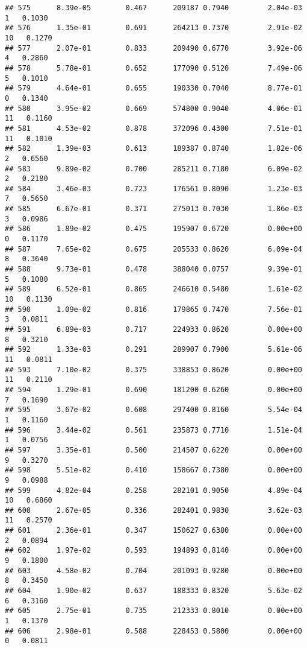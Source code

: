 \documentclass[
]{article}
\begin{document}
\begin{verbatim}
## 575      8.39e-05        0.467      209187 0.7940         2.04e-03   1   0.1030
## 576      1.35e-01        0.691      264213 0.7370         2.91e-02  10   0.1270
## 577      2.07e-01        0.833      209490 0.6770         3.92e-06   4   0.2860
## 578      5.78e-01        0.652      177090 0.5120         7.49e-06   5   0.1010
## 579      4.64e-01        0.655      190330 0.7040         8.77e-01   0   0.1340
## 580      3.95e-02        0.669      574800 0.9040         4.06e-01  11   0.1160
## 581      4.53e-02        0.878      372096 0.4300         7.51e-01  11   0.1010
## 582      1.39e-03        0.613      189387 0.8740         1.82e-06   2   0.6560
## 583      9.89e-02        0.700      285211 0.7180         6.09e-02   2   0.2180
## 584      3.46e-03        0.723      176561 0.8090         1.23e-03   7   0.5650
## 585      6.67e-01        0.371      275013 0.7030         1.86e-03   3   0.0986
## 586      1.89e-02        0.475      195907 0.6720         0.00e+00   0   0.1170
## 587      7.65e-02        0.675      205533 0.8620         6.09e-04   8   0.3640
## 588      9.73e-01        0.478      388040 0.0757         9.39e-01   5   0.1080
## 589      6.52e-01        0.865      246610 0.5480         1.61e-02  10   0.1130
## 590      1.09e-02        0.816      179865 0.7470         7.56e-01   3   0.0811
## 591      6.89e-03        0.717      224933 0.8620         0.00e+00   8   0.3210
## 592      1.33e-03        0.291      289907 0.7900         5.61e-06  11   0.0811
## 593      7.10e-02        0.375      338853 0.8620         0.00e+00  11   0.2110
## 594      1.29e-01        0.690      181200 0.6260         0.00e+00   7   0.1690
## 595      3.67e-02        0.608      297400 0.8160         5.54e-04   1   0.1160
## 596      3.44e-02        0.561      235873 0.7710         1.51e-04   1   0.0756
## 597      3.35e-01        0.500      214507 0.6220         0.00e+00   9   0.3270
## 598      5.51e-02        0.410      158667 0.7380         0.00e+00   9   0.0988
## 599      4.82e-04        0.258      282101 0.9050         4.89e-04  10   0.6860
## 600      2.67e-05        0.336      282401 0.9830         3.62e-03  11   0.2570
## 601      2.36e-01        0.347      150627 0.6380         0.00e+00   2   0.0894
## 602      1.97e-02        0.593      194893 0.8140         0.00e+00   9   0.1800
## 603      4.58e-02        0.704      201093 0.9280         0.00e+00   8   0.3450
## 604      1.90e-02        0.637      188333 0.8320         5.63e-02   6   0.3160
## 605      2.75e-01        0.735      212333 0.8010         0.00e+00   1   0.1370
## 606      2.98e-01        0.588      228453 0.5800         0.00e+00   0   0.0811

\end{verbatim}
\end{document}
